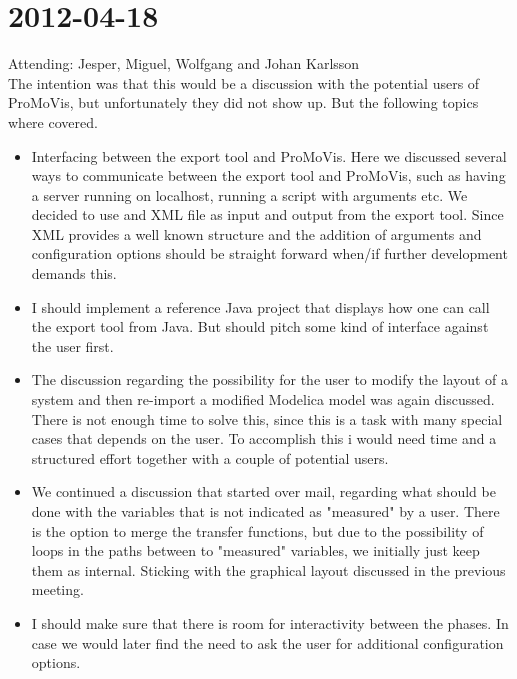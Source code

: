\section{2012-04-18}
Attending: Jesper, Miguel, Wolfgang and Johan Karlsson\\\newline The intention was that this would be a discussion with the potential users of ProMoVis, but unfortunately they did not show up. But the following topics where covered.
\begin{itemize}
\item Interfacing between the export tool and ProMoVis. Here we discussed several ways to communicate between the export tool and ProMoVis, such as having a server running on localhost, running a script with arguments etc. We decided to use and XML file as input and output from the export tool. Since XML provides a well known structure and the addition of arguments and configuration options should be straight forward when/if further development demands this. 
\item I should implement a reference Java project that displays how one can call the export tool from Java. But should pitch some kind of interface against the user first.
\item The discussion regarding the possibility for the user to modify the layout of a system and then re-import a modified Modelica model was again discussed. There is not enough time to solve this, since this is a task with many special cases that depends on the user. To accomplish this i would need time and a structured effort together with a couple of potential users. 
\item We continued a discussion that started over mail, regarding what should be done with the variables that is not indicated as "measured" by a user. There is the option to merge the transfer functions, but due to the possibility of loops in the paths between to "measured" variables, we initially just keep them as internal. Sticking with the graphical layout discussed in the previous meeting.
\item I should make sure that there is room for interactivity between the phases. In case we would later find the need to ask the user for additional configuration options.
\end{itemize}

